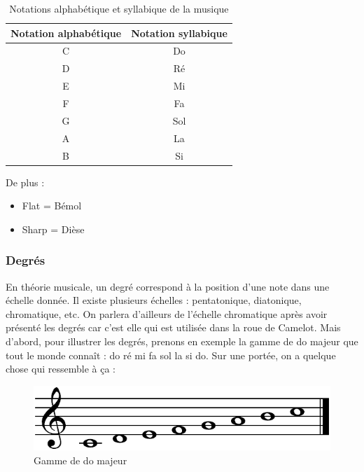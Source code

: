 \documentclass[a4paper,12pt]{article}
\begin{document}
\begin{table}
  \centering
  \begin{tabular}{|c|c|}
    \hline
    Notation alphabétique & Notation syllabique \\
    \hline
    C & Do \\
    D & Ré \\
    E & Mi \\
    F & Fa \\
    G & Sol \\
    A & La \\
    B & Si \\
    \hline
  \end{tabular}
  \caption{Notations alphabétique et syllabique de la musique}
\end{table}

\newpage

De plus :

\begin{itemize}
 \item{Flat = Bémol}
 \item{Sharp = Dièse}
\end{itemize}

\subsubsection{Degrés}

En théorie musicale, un degré correspond à la position d'une note dans une échelle donnée. Il existe plusieurs échelles : pentatonique, diatonique, chromatique, etc. On parlera d'ailleurs de l'échelle chromatique après avoir présenté les degrés car c'est elle qui est utilisée dans la roue de Camelot. Mais d'abord, pour illustrer les degrés, prenons en exemple la gamme de do majeur que tout le monde connaît : do ré mi fa sol la si do. Sur une portée, on a quelque chose qui ressemble à ça :

\begin{figure}[h]
  \begin{center}
    \includegraphics[scale=0.5]{gamme-do.png}
    \caption{Gamme de do majeur}
  \end{center}
\end{figure}
\end{document}
